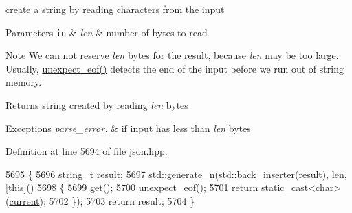 create a string by reading characters from the input 


\begin{DoxyParams}[1]{Parameters}
\mbox{\tt in}  & {\em len} & number of bytes to read\\
\hline
\end{DoxyParams}
\begin{DoxyNote}{Note}
We can not reserve {\itshape len} bytes for the result, because {\itshape len} may be too large. Usually, \hyperlink{classnlohmann_1_1detail_1_1binary__reader_a1dfc55484af3a896c376b41cd99f3e15}{unexpect\+\_\+eof()} detects the end of the input before we run out of string memory.
\end{DoxyNote}
\begin{DoxyReturn}{Returns}
string created by reading {\itshape len} bytes
\end{DoxyReturn}

\begin{DoxyExceptions}{Exceptions}
{\em parse\+\_\+error.} & if input has less than {\itshape len} bytes \\
\hline
\end{DoxyExceptions}


Definition at line 5694 of file json.\+hpp.


\begin{DoxyCode}
5695     \{
5696         \hyperlink{classnlohmann_1_1detail_1_1binary__reader_a889a8702ca8aa45e99136bc31ea898e9}{string\_t} result;
5697         std::generate\_n(std::back\_inserter(result), len, [\textcolor{keyword}{this}]()
5698         \{
5699             \textcolor{keyword}{get}();
5700             \hyperlink{classnlohmann_1_1detail_1_1binary__reader_a1dfc55484af3a896c376b41cd99f3e15}{unexpect\_eof}();
5701             \textcolor{keywordflow}{return} \textcolor{keyword}{static\_cast<}\textcolor{keywordtype}{char}\textcolor{keyword}{>}(\hyperlink{classnlohmann_1_1detail_1_1binary__reader_a7e994e201b215cd6d6ae28a1853f43e0}{current});
5702         \});
5703         \textcolor{keywordflow}{return} result;
5704     \}
\end{DoxyCode}
\mbox{\label{classnlohmann_1_1detail_1_1binary__reader_ab808b713f938c625c22c20f2ac7ff3cf}} 
